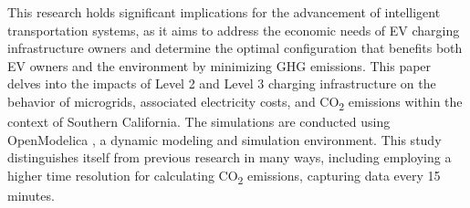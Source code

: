 \documentclass[conference,  usletter]{IEEEtran}
\begin{document}
This research holds significant implications for the advancement of intelligent transportation systems, as it aims to address the economic needs of EV charging infrastructure owners and determine the optimal configuration that benefits both EV owners and the environment by minimizing GHG emissions. This paper delves into the impacts of  Level 2 and Level 3 charging infrastructure on the behavior of microgrids, associated electricity costs, and CO\textsubscript{2} emissions within the context of Southern California. The simulations are conducted using OpenModelica \cite{ModelicaLanguage}, a dynamic modeling and simulation environment. This study distinguishes itself from previous research in many ways, including employing a higher time resolution for calculating CO\textsubscript{2} emissions, capturing data every 15 minutes.
\end{document}
